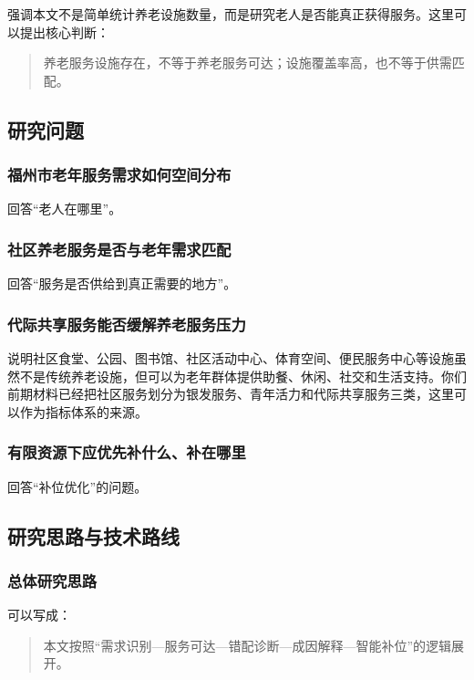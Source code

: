 \documentclass[UTF8,zihao=-4,a4paper,fontset=none]{ctexart}
\begin{document}
强调本文不是简单统计养老设施数量，而是研究老人是否能真正获得服务。这里可以提出核心判断：

\begin{quote}
养老服务设施存在，不等于养老服务可达；设施覆盖率高，也不等于供需匹配。
\end{quote}

\subsection{研究问题}

\subsubsection{福州市老年服务需求如何空间分布}

回答“老人在哪里”。

\subsubsection{社区养老服务是否与老年需求匹配}

回答“服务是否供给到真正需要的地方”。

\subsubsection{代际共享服务能否缓解养老服务压力}

说明社区食堂、公园、图书馆、社区活动中心、体育空间、便民服务中心等设施虽然不是传统养老设施，但可以为老年群体提供助餐、休闲、社交和生活支持。你们前期材料已经把社区服务划分为银发服务、青年活力和代际共享服务三类，这里可以作为指标体系的来源。

\subsubsection{有限资源下应优先补什么、补在哪里}

回答“补位优化”的问题。

\subsection{研究思路与技术路线}

\subsubsection{总体研究思路}

可以写成：

\begin{quote}
本文按照“需求识别—服务可达—错配诊断—成因解释—智能补位”的逻辑展开。
\end{quote}
\end{document}
